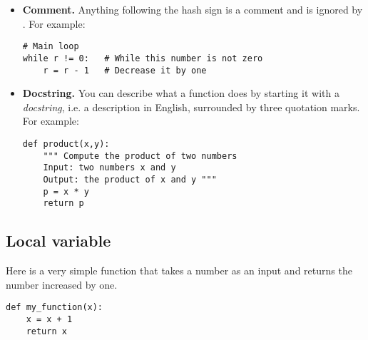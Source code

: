 \documentclass[11pt,class=report,crop=false]{standalone}
\begin{document}
\begin{itemize}
  \item \textbf{Comment.} Anything following the hash sign \ci{#} is a comment and is ignored by \Python. 
  For example:
\begin{lstlisting}
# Main loop
while r != 0:   # While this number is not zero
    r = r - 1   # Decrease it by one
\end{lstlisting}
  
  \item \textbf{Docstring.} You can describe what a function does by starting it with a \emph{docstring}, i.e. a description     
in English, surrounded by three quotation marks.  
 For example:
\begin{lstlisting}
def product(x,y):
    """ Compute the product of two numbers
    Input: two numbers x and y
    Output: the product of x and y """
    p = x * y
    return p 
\end{lstlisting} 

\end{itemize}


\subsection{Local variable}

Here is a very simple function that takes a number as an input and returns the number increased by one.
\begin{center}
\begin{lstlisting}
def my_function(x):
    x = x + 1
    return x
\end{lstlisting}
\end{center}
\end{document}
